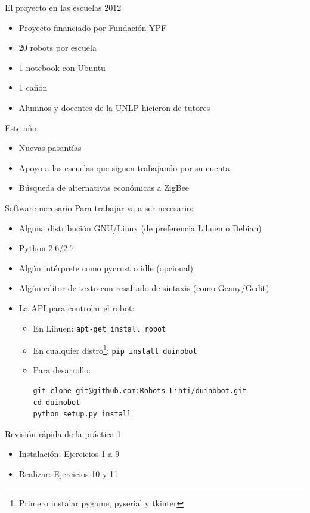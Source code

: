 \documentclass{beamer}[10]
\begin{document}
\begin{frame}{El proyecto en las escuelas 2012}
	\begin{itemize}[<+->]
		\item Proyecto financiado por Fundación YPF
		\item 20 robots por escuela
		\item 1 notebook con Ubuntu
		\item 1 cañón
		\item Alumnos y docentes de la UNLP hicieron de tutores
	\end{itemize}
\end{frame}
\begin{frame}{Este año}
	\begin{itemize}[<+->]
		\item Nuevas pasantías
		\item Apoyo a las escuelas que siguen trabajando por su cuenta
		\item Búsqueda de alternativas económicas a ZigBee
	\end{itemize}
\end{frame}
\begin{frame}[fragile]{Software necesario}
	Para trabajar va a ser necesario:
	\begin{itemize}[<+->]
		\item Alguna distribución GNU/Linux (de preferencia Lihuen o Debian)
		\item Python 2.6/2.7
		\item Algún intérprete como pycrust o idle (opcional)
		\item Algún editor de texto con resaltado de sintaxis (como Geany/Gedit)
		\item La API para controlar el robot:
			\begin{itemize}
				\item En Lihuen:
\verb+apt-get install robot+
				\item En cualquier distro\footnote{Primero instalar pygame, pyserial y tkinter}:
\verb+pip install duinobot+
				\item Para desarrollo:
{\footnotesize
\begin{verbatim}
git clone git@github.com:Robots-Linti/duinobot.git
cd duinobot
python setup.py install
\end{verbatim}
}
			\end{itemize}
	\end{itemize}
\end{frame}
\begin{frame}{Revisión rápida de la práctica 1}
	\begin{itemize}[<+->]
		\item Instalación: Ejercicios 1 a 9
		\item Realizar: Ejercicios 10 y 11
	\end{itemize}
\end{frame}
\end{document}
